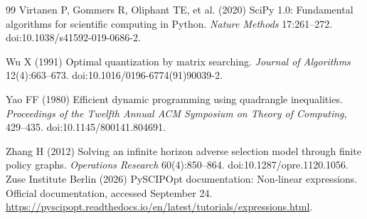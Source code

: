 \begin{thebibliography}{99}
Virtanen P, Gommers R, Oliphant TE, et al. (2020) SciPy 1.0: Fundamental algorithms for scientific computing in Python. \emph{Nature Methods} 17:261--272. doi:10.1038/s41592-019-0686-2.

Wu X (1991) Optimal quantization by matrix searching. \emph{Journal of Algorithms} 12(4):663--673. doi:10.1016/0196-6774(91)90039-2.

Yao FF (1980) Efficient dynamic programming using quadrangle inequalities. \emph{Proceedings of the Twelfth Annual ACM Symposium on Theory of Computing}, 429--435. doi:10.1145/800141.804691.

Zhang H (2012) Solving an infinite horizon adverse selection model through finite policy graphs. \emph{Operations Research} 60(4):850--864. doi:10.1287/opre.1120.1056.
Zuse Institute Berlin (2026) PySCIPOpt documentation: Non-linear expressions. Official documentation, accessed September 24. \url{https://pyscipopt.readthedocs.io/en/latest/tutorials/expressions.html}.
\end{thebibliography}
